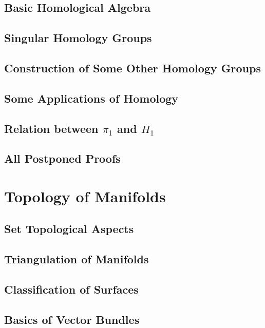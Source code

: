 \documentclass[11pt, a4paper]{article}
\begin{document}
\subsection{Basic Homological Algebra}

\subsection{Singular Homology Groups}

\subsection{Construction of Some Other Homology Groups}

\subsection{Some Applications of Homology}

\subsection{Relation between $\pi_1$ and $H_1$}

\subsection{All Postponed Proofs}

\section{Topology of Manifolds}

\subsection{Set Topological Aspects}

\subsection{Triangulation of Manifolds}

\subsection{Classification of Surfaces}

\subsection{Basics of Vector Bundles}
\end{document}
